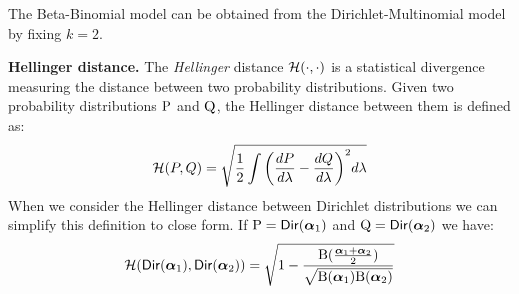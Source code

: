 \documentclass{article}
\begin{document}
%
The Beta-Binomial model can be obtained from the Dirichlet-Multinomial
model by fixing $k=2$. 

\noindent \textbf{Hellinger distance.}
The \emph{Hellinger} distance $\mathcal{H}(\cdot,\cdot)$ is a statistical
divergence measuring the distance between two probability
distributions. Given two probability distributions $\textup{P}$ and $\textup{Q}$,
the Hellinger distance between them is defined as:
\[
\mathcal{H}(P,Q) =\sqrt{\frac{1}{2} \int \bigg(\frac{dP}{d \lambda} - \frac{dQ}{d \lambda}\bigg)^2 d \lambda}
\]
When we consider the Hellinger distance between Dirichlet
distributions we can simplify this definition to close form. If $\textup{P}=\mathsf{Dir}(\boldsymbol{\alpha}_1)$ and
$\textup{Q}=\mathsf{Dir}(\boldsymbol{\alpha}_2)$ we have: 
 \[
   \mathcal{H}(\mathsf{Dir}(\boldsymbol{\alpha}_1), \mathsf{Dir}(\boldsymbol{\alpha}_2)) = \sqrt{1 - \frac{\textup{B}(\frac{\boldsymbol{\alpha}_1 + \boldsymbol{\alpha}_2}{2})}{\sqrt{\textup{B}(\boldsymbol{\alpha}_1) \textup{B}(\boldsymbol{\alpha}_2)}}}
 \]
\end{document}
